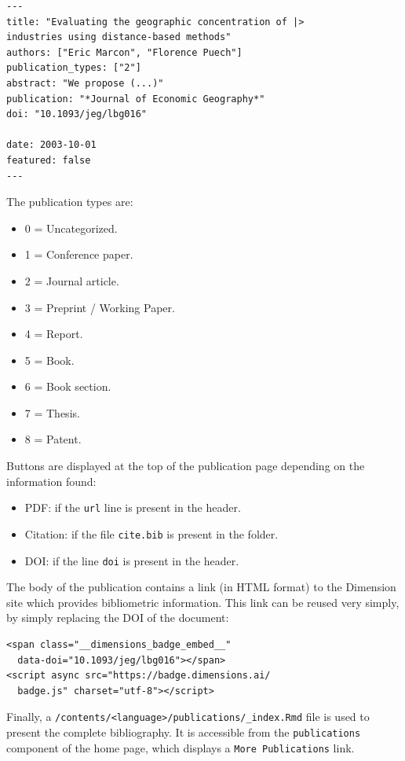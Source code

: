 \documentclass[
  12pt,
  american,
  a4paper,
  extrafontsizes,onecolumn,openright
  ]{memoir}
\providecommand{\tightlist}{%
  \setlength{\itemsep}{0pt}\setlength{\parskip}{0pt}}
\begin{document}
\begin{verbatim}
---
title: "Evaluating the geographic concentration of |>
industries using distance-based methods"
authors: ["Eric Marcon", "Florence Puech"]
publication_types: ["2"]
abstract: "We propose (...)"
publication: "*Journal of Economic Geography*"
doi: "10.1093/jeg/lbg016"

date: 2003-10-01
featured: false
---
\end{verbatim}

The publication types are:

\begin{itemize}
\tightlist
\item
  0 = Uncategorized.
\item
  1 = Conference paper.
\item
  2 = Journal article.
\item
  3 = Preprint / Working Paper.
\item
  4 = Report.
\item
  5 = Book.
\item
  6 = Book section.
\item
  7 = Thesis.
\item
  8 = Patent.
\end{itemize}

Buttons are displayed at the top of the publication page depending on the information found:

\begin{itemize}
\tightlist
\item
  PDF: if the \texttt{url} line is present in the header.
\item
  Citation: if the file \texttt{cite.bib} is present in the folder.
\item
  DOI: if the line \texttt{doi} is present in the header.
\end{itemize}

The body of the publication contains a link (in HTML format) to the Dimension site which provides bibliometric information.
This link can be reused very simply, by simply replacing the DOI of the document:

\begin{verbatim}
<span class="__dimensions_badge_embed__" 
  data-doi="10.1093/jeg/lbg016"></span>
<script async src="https://badge.dimensions.ai/
  badge.js" charset="utf-8"></script>
\end{verbatim}

Finally, a \texttt{/contents/\textless{}language\textgreater{}/publications/\_index.Rmd} file is used to present the complete bibliography.
It is accessible from the \texttt{publications} component of the home page, which displays a \texttt{More\ Publications} link.
\end{document}
